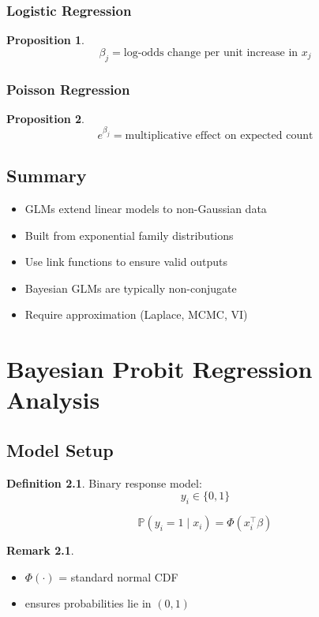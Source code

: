 \documentclass[12pt,oneside]{book}
\numberwithin{equation}{section}
\theoremstyle{definition}
\newtheorem{definition}{Definition}[section]
\newtheorem{remark}{Remark}[section]
\theoremstyle{plain}
\newtheorem{proposition}{Proposition}[section]
\theoremstyle{remark}
\newcommand{\Prob}{\mathbb{P}}
\begin{document}
\subsection{Logistic Regression}

\begin{proposition}
$$
\beta_j = \text{log-odds change per unit increase in } x_j
$$
\end{proposition}

\subsection{Poisson Regression}

\begin{proposition}
$$
e^{\beta_j} = \text{multiplicative effect on expected count}
$$
\end{proposition}

\section{Summary}

\begin{itemize}
\item GLMs extend linear models to non-Gaussian data
\item Built from exponential family distributions
\item Use link functions to ensure valid outputs
\item Bayesian GLMs are typically non-conjugate
\item Require approximation (Laplace, MCMC, VI)
\end{itemize}

\chapter{Bayesian Probit Regression Analysis}

\section{Model Setup}

\begin{definition}
Binary response model:
$$
y_i \in \{0,1\}
$$

$$
\Prob(y_i = 1 \mid x_i) = \Phi(x_i^\top \beta)
$$
\end{definition}

\begin{remark}
\begin{itemize}
\item $\Phi(\cdot)$ = standard normal CDF
\item ensures probabilities lie in $(0,1)$
\end{itemize}
\end{remark}
\end{document}
